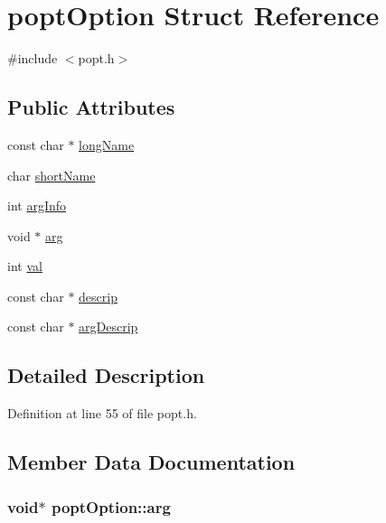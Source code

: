 \hypertarget{structpopt_option}{}\section{popt\+Option Struct Reference}
\label{structpopt_option}


{\ttfamily \#include $<$popt.\+h$>$}

\subsection*{Public Attributes}
\begin{DoxyCompactItemize}
\item 
const char $\ast$ \hyperlink{structpopt_option_acb5681d547739c8417c87aabd7ca7a7f}{long\+Name}
\item 
char \hyperlink{structpopt_option_a966cc537f19dfbd443e768a99dec1f23}{short\+Name}
\item 
int \hyperlink{structpopt_option_a5b1233c5fb30a60d1e8b0c41492ead5f}{arg\+Info}
\item 
void $\ast$ \hyperlink{structpopt_option_a6915698448ea2e263ad0cf0756d8df65}{arg}
\item 
int \hyperlink{structpopt_option_aa6a9c91f5c1869870c3b872395e2b625}{val}
\item 
const char $\ast$ \hyperlink{structpopt_option_ad0123e0f28a19468eb34e89753064745}{descrip}
\item 
const char $\ast$ \hyperlink{structpopt_option_aa0eff46a712ca64ea3103be9f73f4373}{arg\+Descrip}
\end{DoxyCompactItemize}


\subsection{Detailed Description}


Definition at line 55 of file popt.\+h.



\subsection{Member Data Documentation}
\hypertarget{structpopt_option_a6915698448ea2e263ad0cf0756d8df65}{}
\subsubsection[{arg}]{\setlength{\rightskip}{0pt plus 5cm}void$\ast$ popt\+Option\+::arg}\label{structpopt_option_a6915698448ea2e263ad0cf0756d8df65}


